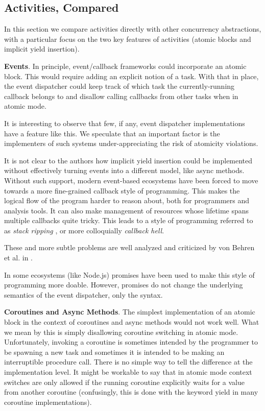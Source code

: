 \documentclass[a4paper,UKenglish,cleveref, autoref]{lipics-v2019}
\begin{document}
\subsection{Activities, Compared}

In this section we compare activities directly with other concurrency abstractions, with a particular focus on the two key features of activities (atomic blocks and implicit yield insertion).

\textbf{Events}.
In principle, event/callback frameworks could incorporate an atomic block.
This would require adding an explicit notion of a task.
With that in place, the event dispatcher could keep track of which task the currently-running callback belongs to and disallow calling callbacks from other tasks when in atomic mode.

It is interesting to observe that few, if any, event dispatcher implementations have a feature like this.
We speculate that an important factor is the implementers of such systems under-appreciating the risk of atomicity violations.

It is not clear to the authors how implicit yield insertion could be implemented without effectively turning events into a different model, like async methods.
Without such support, modern event-based ecosystems have been forced to move towards a more fine-grained callback style of programming.
This makes the logical flow of the program harder to reason about, both for programmers and analysis tools.
It can also make management of resources whose lifetime spans multiple callbacks quite tricky.
This leads to a style of programming referred to as \emph{stack ripping} \cite{Adya2002}, or more colloquially \emph{callback hell}.

These and more subtle problems are well analyzed and criticized by von Behren et al. in \cite{Behren2003a}.

In some ecosystems (like Node.js) promises have been used to make this style of programming more doable.
However, promises do not change the underlying semantics of the event dispatcher, only the syntax.

\textbf{Coroutines and Async Methods}.
The simplest implementation of an atomic block in the context of coroutines and async methods would not work well.
What we mean by this is simply disallowing coroutine switching in atomic mode.
Unfortunately, invoking a coroutine is sometimes intended by the programmer to be spawning a new task and sometimes it is intended to be making an interruptible procedure call.
There is no simple way to tell the difference at the implementation level.
It might be workable to say that in atomic mode context switches are only allowed if the running coroutine explicitly waits for a value from another coroutine (confusingly, this is done with the keyword yield in many coroutine implementations).
\end{document}
